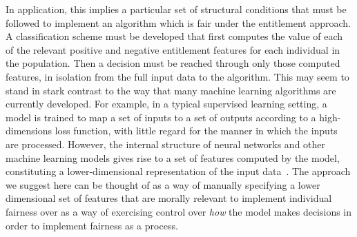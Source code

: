 In application, this implies a particular set of structural conditions that must
be followed to implement an algorithm which is fair under the entitlement
approach. A classification scheme must be developed that first computes the
value of each of the relevant positive and negative entitlement features for
each individual in the population. Then a decision must be reached through only
those computed features, in isolation from the full input data to the algorithm.
This may seem to stand in stark contrast to the way that many machine learning
algorithms are currently developed. For example, in a typical supervised
learning setting, a model is trained to map a set of inputs to a set of outputs
according to a high-dimensions loss function, with little regard for the
manner in which the inputs are processed. However, the internal structure of
neural networks and other machine learning models gives rise to a set of
features computed by the model, constituting a lower-dimensional representation
of the input data~\citep{Liu_2018}. The approach we suggest here can be thought
of as a way of manually specifying a lower dimensional set of features that
are morally relevant to implement individual fairness over as a way of
exercising control over \emph{how} the model makes decisions in order to
implement fairness as a process.

